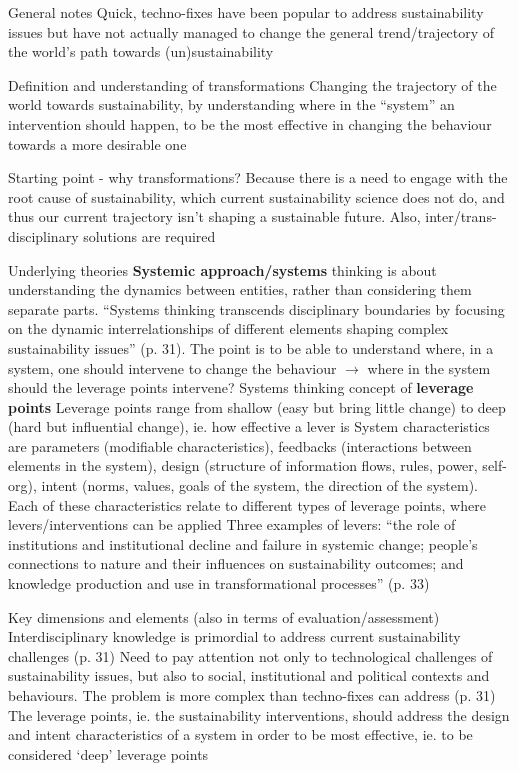 \documentclass{article}
\begin{document}
\begin{outline}
	\1 General notes
		\2 Quick, techno-fixes have been popular to address sustainability issues but have not actually managed to change the general trend/trajectory of the world's path towards (un)sustainability
	
	\1 Definition and understanding of transformations
		\2 Changing the trajectory of the world towards sustainability, by understanding where in the ``system'' an intervention should happen, to be the most effective in changing the behaviour towards a more desirable one
	
	\1 Starting point - why transformations?
		\2 Because there is a need to engage with the root cause of sustainability, which current sustainability science does not do, and thus our current trajectory isn't shaping a sustainable future. Also, inter/trans-disciplinary solutions are required
	
	\1 Underlying theories
		\2 \textbf{Systemic approach/systems} thinking is about understanding the dynamics between entities, rather than considering them separate parts. ``Systems thinking transcends disciplinary boundaries by focusing on the dynamic interrelationships of different elements shaping complex sustainability issues'' (p. 31). The point is to be able to understand where, in a system, one should intervene to change the behaviour $\rightarrow$ where in the system should the leverage points intervene?
		\2 Systems thinking concept of \textbf{leverage points}
			\3 Leverage points range from shallow (easy but bring little change) to deep (hard but influential change), ie. how effective a lever is
			\3 System characteristics are parameters (modifiable characteristics), feedbacks (interactions between elements in the system), design (structure of information flows, rules, power, self-org), intent (norms, values, goals of the system, the direction of the system). Each of these characteristics relate to different types of leverage points, where levers/interventions can be applied
			\3 Three examples of levers: ``the role of institutions and institutional decline and failure in systemic change; people's connections to nature and their influences on sustainability outcomes; and knowledge production and use in transformational processes'' (p. 33)
			
			
	\1 Key dimensions and elements (also in terms of evaluation/assessment)
		\2 Interdisciplinary knowledge is primordial to address current sustainability challenges (p. 31)
		\2 Need to pay attention not only to technological challenges of sustainability issues, but also to social, institutional and political contexts and behaviours. The problem is more complex than techno-fixes can address (p. 31)
		\2 The leverage points, ie. the sustainability interventions, should address the design and intent characteristics of a system in order to be most effective, ie. to be considered `deep' leverage points
\end{outline}

\printbibliography
\end{document}
